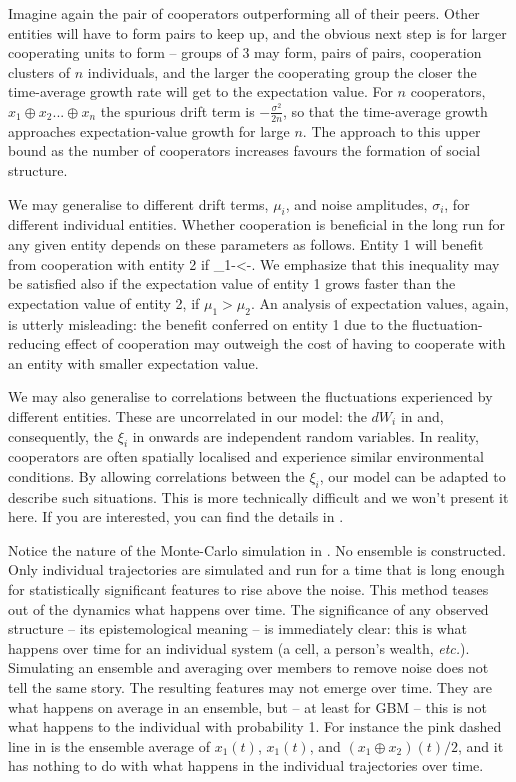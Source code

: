 Imagine again the pair of cooperators outperforming all of their peers. Other
entities will have to form pairs to keep up, and the obvious next step is for larger
cooperating units to form -- groups of 3 may form, pairs of pairs, cooperation 
clusters of $n$ individuals, and the larger the cooperating group the closer the
time-average growth rate will get to the expectation value.
For $n$ cooperators, $x_1\oplus x_2 ... \oplus x_n$ the spurious drift term is 
$-\frac{\sigma^2}{2n}$, so that the time-average growth approaches 
expectation-value growth for large $n$. The approach to this upper bound as 
the number of cooperators increases favours the formation of social structure. 

We may generalise to different drift 
terms, $\mu_i$, and noise amplitudes, $\sigma_i$, for different individual entities. 
Whether cooperation is beneficial in the long run for any
given entity depends on these parameters as follows. Entity 1 
will benefit from cooperation with entity 2 if 
\be
\mu_1-<-.
\ee
We emphasize that this inequality may be satisfied also if the expectation value
of entity 1 grows faster than the expectation value of entity 2, \ie if
$\mu_1>\mu_2$. An analysis of expectation values, again, is utterly misleading:
the benefit conferred on entity 1 due to the fluctuation-reducing effect of 
cooperation may outweigh the cost of having to cooperate with an entity with
smaller expectation value.

We may also generalise to correlations between the fluctuations experienced by different entities. These are uncorrelated in our model: the $dW_i$ in  and, consequently, the $\xi_i$ in  onwards are independent random variables. In reality, cooperators are often spatially localised and experience similar environmental conditions. By allowing correlations between the $\xi_i$, our model can be adapted to describe such situations. This is more technically difficult and we won't present it here. If you are interested, you can find the details in \cite{PetersAdamou2015a}.
 
Notice the nature of the Monte-Carlo simulation in . No ensemble
is constructed. Only individual trajectories are simulated and run for a time that is 
long enough for statistically significant features to rise above the noise. This method
teases out of the dynamics what happens over time. The significance of any observed 
structure -- its epistemological meaning -- is immediately clear: this is what happens over time
for an individual system (a cell, a person's wealth, {\it etc.}). Simulating an ensemble
and averaging over members to remove noise does not tell the same story. The resulting
features may not emerge over time. They are what happens on average in an ensemble, 
but -- at least for GBM -- this is not what happens to the individual with probability 1. For instance the 
 pink dashed line in  is the ensemble average of $x_1(t)$, $x_1(t)$, 
 and $(x_1 \oplus x_2)(t)/2$, and it has nothing to do with what happens 
 in the individual trajectories over time.

